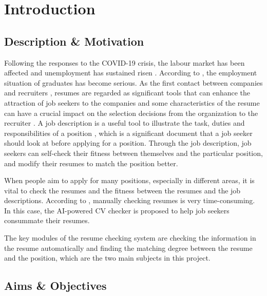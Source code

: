 \chapter{Introduction}
\label{ch:introduction}



\section{Description \& Motivation}



Following the responses to the COVID-19 crisis, the labour market has been affected and unemployment has sustained risen \cite{mayhew2020covid}. According to \cite{yang2019decision}, the employment situation of graduates has become serious. As the first contact between companies and recruiters \cite{thoms1999resume}, resumes are regarded as significant tools that can enhance the attraction of job seekers to the companies \cite{hornsby1995resume} and some characteristics of the resume can have a crucial impact on the selection decisions from the organization to the recruiter \cite{van2015difference}. A job description is a useful tool to illustrate the task, duties and responsibilities of a position \cite{enwiki:1043689877}, which is a significant document that a job seeker should look at before applying for a position. Through the job description, job seekers can self-check their fitness between themselves and the particular position, and modify their resumes to match the position better. 

When people aim to apply for many positions, especially in different areas, it is vital to check the resumes and the fitness between the resumes and the job descriptions. According to \cite{bhatt2016resume}, manually checking resumes is very time-consuming. In this case, the AI-powered CV checker is proposed to help job seekers consummate their resumes. 

The key modules of the resume checking system are checking the information in the resume automatically and finding the matching degree between the resume and the position, which are the two main subjects in this project.

\section{Aims \& Objectives}

